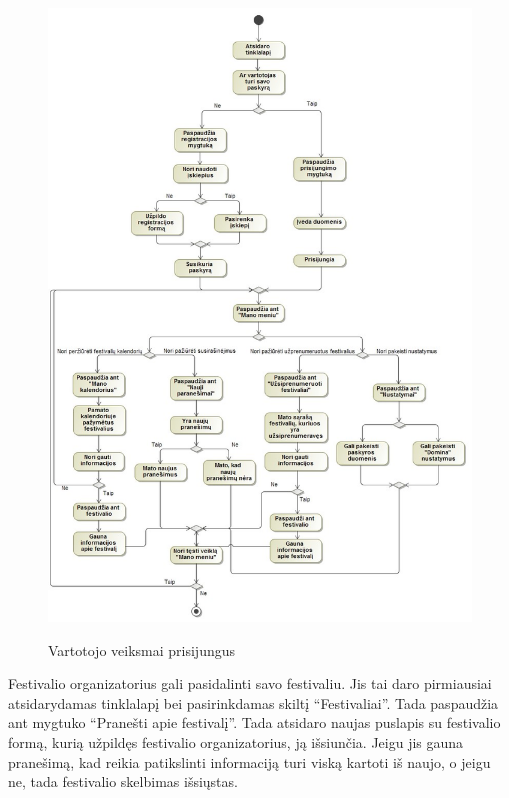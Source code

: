 ﻿\documentclass{VUMIFPSkursinis}
\begin{document}
\begin{figure}[H]
	\centering
    \includegraphics[scale=0.5]{img/Pav/VartotojasPrisijungesFunk}
	\label{uml:24}
	\caption{Vartotojo veiksmai prisijungus}
\end{figure}

Festivalio organizatorius gali pasidalinti savo festivaliu. Jis tai daro pirmiausiai atsidarydamas tinklalapį bei pasirinkdamas skiltį “Festivaliai”. Tada paspaudžia ant mygtuko “Pranešti apie festivalį”. Tada atsidaro naujas puslapis su festivalio formą, kurią užpildęs festivalio organizatorius, ją išsiunčia. Jeigu jis gauna pranešimą, kad reikia patikslinti informaciją turi viską kartoti iš naujo, o jeigu ne, tada festivalio skelbimas išsiųstas.
\end{document}

